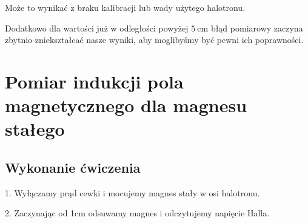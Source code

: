 \documentclass{fizykalab}
\begin{document}
{{{Może to wynikać z braku kalibracji lub wady użytego halotronu.

\mbox{}\newline
Dodatkowo dla wartości już w odległości powyżej $\SI{5}{\centi\meter}$ błąd pomiarowy zaczyna zbytnio zniekształcać nasze wyniki, aby moglibyśmy być pewni ich poprawności.

\newpage

\section*{Pomiar indukcji pola magnetycznego dla magnesu stałego}
{\setlength{\parindent}{0pt}
\subsection*{Wykonanie ćwiczenia}
\par
1. Wyłączamy prąd cewki i mocujemy magnes stały w osi halotronu.

2. Zaczynając od 1cm odsuwamy magnes i odczytujemy napięcie Halla.

}}}}
\end{document}
